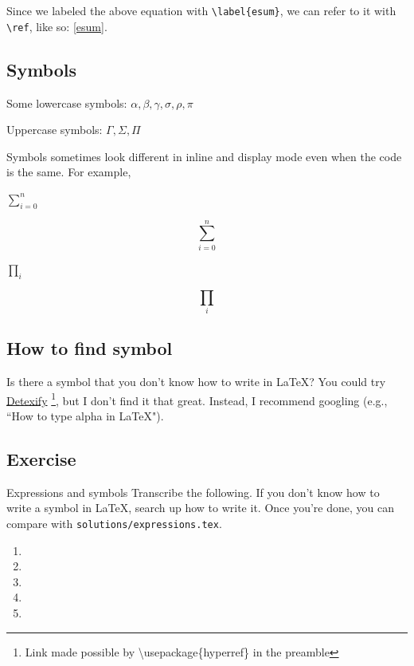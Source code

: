 \documentclass{article}
\begin{document}
Since we labeled the above equation with \texttt{\textbackslash label\{esum\}}, we can refer to it with \texttt{\textbackslash ref}, like so: \ref{esum}.


\subsection{Symbols}

Some lowercase symbols: $\alpha, \beta, \gamma, \sigma, \rho, \pi$

Uppercase symbols: $\Gamma, \Sigma, \Pi$

Symbols sometimes look different in inline and display mode even when the code is the same. For example,

$\sum_{i=0}^n$

$$\sum_{i=0}^n$$

$\prod_i$

$$\prod_i$$

\subsection{How to find symbol}

Is there a symbol that you don't know how to write in \LaTeX? You could try \href{https://detexify.kirelabs.org/classify.html}{Detexify} \footnote{Link made possible by \textbackslash usepackage\{hyperref\} in the preamble}, but I don't find it that great. Instead, I recommend googling (e.g., ``How to type alpha in LaTeX").

\subsection{Exercise}

\begin{exercise}{Expressions and symbols}{}
    Transcribe the following. If you don't know how to write a symbol in \LaTeX, search up how to write it. Once you're done, you can compare with \texttt{solutions/expressions.tex}.

    
\end{exercise}

\begin{solution}{}{}
    \begin{enumerate}
        \item 
        \item 
        \item 
        \item 
        \item 
    \end{enumerate}
\end{solution}
\end{document}
